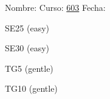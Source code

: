 \documentclass[landscape,10pt]{article}
\title{}
\author{Germán Avendaño Ramírez}
\begin{document}
Nombre: \hrulefill Curso: \underline{603} Fecha: \underline{\hspace{100pt}}
\vspace{15pt}

\cluefont{\Large}
\begin{minipage}{.5\textwidth}
\begin{minipage}{0.95\linewidth}\begin{center}
SE25 (easy) \\
\end{center}\end{minipage} 
\end{minipage}
\begin{minipage}{.5\textwidth}
\begin{minipage}{0.95\linewidth}\begin{center}
SE30 (easy) \\
\end{center}\end{minipage} 
\end{minipage}


\begin{minipage}{0.95\linewidth}\begin{center}
TG5 (gentle) \\
\end{center}\end{minipage}

\vspace*{20pt}
\begin{minipage}{0.95\linewidth}\begin{center}
TG10 (gentle) \\
\end{center}\end{minipage}
\end{document}
